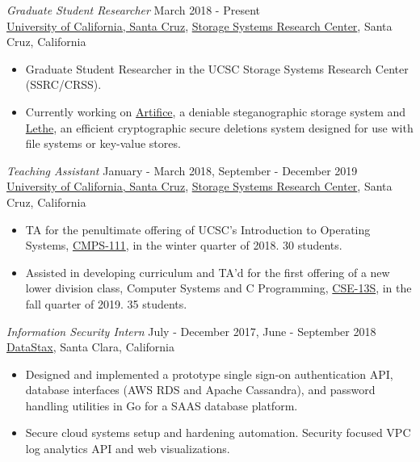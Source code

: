 \documentclass[margin, 10pt]{res} %
\begin{document}
\begin{resume}
{\sl Graduate Student Researcher} \hfill March 2018 - Present \\
\href{http://www.ucsc.edu}{University of California, Santa Cruz}, \href{https://ssrc.ucsc.edu}{Storage Systems Research Center}, Santa Cruz, California
\begin{itemize}
\item Graduate Student Researcher in the UCSC Storage Systems Research Center (SSRC/CRSS).
\item Currently working on \href{https://www.ssrc.ucsc.edu/proj/Artifice.html}{Artifice}, a deniable steganographic storage system and \href{https://www.ssrc.ucsc.edu/proj/securefs.html}{Lethe}, an efficient 
cryptographic secure deletions system designed for use with file systems or key-value stores. 
\end{itemize}

{\sl Teaching Assistant} \hfill January - March 2018, September - December 2019 \\
\href{http://www.ucsc.edu}{University of California, Santa Cruz}, \href{https://ssrc.ucsc.edu}{Storage Systems Research Center}, Santa Cruz, California
\begin{itemize}
\item TA for the penultimate offering of UCSC's Introduction to Operating Systems, \href{https://courses.soe.ucsc.edu/courses/cmps111/}{CMPS-111}, 
in the winter quarter of 2018. 30 students.
\item Assisted in developing curriculum and TA'd for the first offering of a new lower division class, Computer Systems and C Programming, 
\href{https://courses.soe.ucsc.edu/courses/cse13s}{CSE-13S}, in the fall quarter of 2019. 35 students.
\end{itemize}

{\sl Information Security Intern} \hfill July - December 2017, June - September 2018\\
\href{http://www.datastax.com}{DataStax}, Santa Clara, California
\begin{itemize}
\item Designed and implemented a prototype single sign-on authentication API, database interfaces (AWS RDS and Apache Cassandra), and password handling utilities in Go for a SAAS database platform.
\item Secure cloud systems setup and hardening automation. Security focused VPC log analytics API and web visualizations. 
\end{itemize}


\end{resume}
\end{document}
